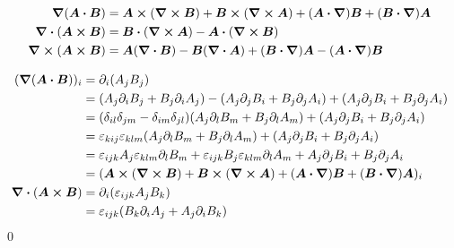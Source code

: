 \documentclass[uplatex,dvipdfmx,a4paper,11pt]{jlreq}
\makeatletter
\newcommand{\rot}{\curl}
\theoremstyle{definition}
\renewenvironment{proof}[1][\proofname]{\par
  \normalfont
  \topsep6\p@\@plus6\p@ \trivlist
  \item[\hskip\labelsep{\bfseries #1}\@addpunct{\bfseries}]\ignorespaces\quad\par
}{%
  \qed\endtrivlist\@endpefalse
}
\renewcommand\proofname{証明}
\makeatother
\begin{document}
\begin{theorem}
  \begin{align}
    \grad{(\bm{A}\vdot\bm{B})} & = \bm{A}\cross(\rot{\bm{B}}) + \bm{B}\cross(\rot{\bm{A}}) + (\bm{A}\vdot\vnabla)\bm{B} + (\bm{B}\vdot\vnabla)\bm{A} \\
    \div{(\bm{A}\cross\bm{B})} & = \bm{B}\vdot(\rot{\bm{A}}) - \bm{A}\vdot(\rot{\bm{B}})                                                             \\
    \rot{(\bm{A}\cross\bm{B})} & = \bm{A}(\div{\bm{B}}) - \bm{B}(\div{\bm{A}}) + (\bm{B}\vdot\vnabla)\bm{A} - (\bm{A}\vdot\vnabla)\bm{B}
  \end{align}
\end{theorem}
\begin{proof}
  \begin{align}
    (\grad{(\bm{A}\vdot\bm{B})})_i & = \partial_i(A_jB_j)                                                                                                                            \\
                                   & = (A_j\partial_iB_j + B_j\partial_iA_j) - (A_j\partial_jB_i + B_j\partial_jA_i) + (A_j\partial_jB_i + B_j\partial_jA_i)                         \\
                                   & = (\delta_{il}\delta_{jm} - \delta_{im}\delta_{jl})(A_j\partial_lB_m + B_j\partial_lA_m) + (A_j\partial_jB_i + B_j\partial_jA_i)                \\
                                   & = \varepsilon_{kij}\varepsilon_{klm}(A_j\partial_lB_m + B_j\partial_lA_m) + (A_j\partial_jB_i + B_j\partial_jA_i)                               \\
                                   & = \varepsilon_{ijk}A_j\varepsilon_{klm}\partial_lB_m + \varepsilon_{ijk}B_j\varepsilon_{klm}\partial_lA_m + A_j\partial_jB_i + B_j\partial_jA_i \\
                                   & = (\bm{A}\cross(\rot{\bm{B}}) + \bm{B}\cross(\rot{\bm{A}}) + (\bm{A}\vdot\vnabla)\bm{B} + (\bm{B}\vdot\vnabla)\bm{A})_i                         \\
    \div{(\bm{A}\cross\bm{B})}     & = \partial_i(\varepsilon_{ijk}A_jB_k)                                                                                                           \\
                                   & = \varepsilon_{ijk}(B_k\partial_iA_j + A_j\partial_iB_k)                                                                                        \\

\end{align}
\end{proof}
\end{document}
